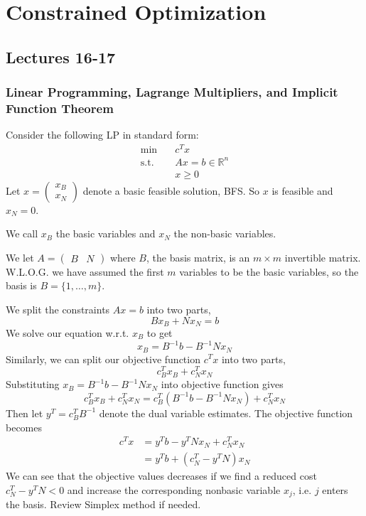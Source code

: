 \newpage
\section{Constrained Optimization}
\subsection{Lectures 16-17}
\subsubsection{Linear Programming, Lagrange Multipliers, and Implicit Function Theorem}
\begin{example}
    Consider the following LP in standard form:
    \begin{align*}
        \min \quad & c^T x \\
        \text{s.t.} \quad & Ax = b \in \mathbb R^n\\
        & x \geq 0
    \end{align*}
    Let $x = \begin{pmatrix}x_B \\ x_N \end{pmatrix}$ denote a basic feasible solution, BFS. So $x$ is feasible and $x_N = 0$. 
    
    We call $x_B$ the basic variables and $x_N$ the non-basic variables. 
    
    We let $A = \begin{pmatrix}B & N\end{pmatrix}$ where $B$, the basis matrix, is an $m \times m$ invertible matrix. W.L.O.G. we have assumed the first $m$ variables to be the basic variables, so the basis is $B = \{1,\ldots,m\}$.

    We split the constraints $Ax = b$ into two parts, $$Bx_B + Nx_N = b$$ 
    We solve our equation w.r.t. $x_B$ to get $$x_B = B^{-1}b - B^{-1}Nx_N$$
    Similarly, we can split our objective function $c^T x$ into two parts, $$c^T_B x_B + c^T_N x_N$$ Substituting $x_B = B^{-1}b - B^{-1}Nx_N$ into objective function gives
    $$c^T_B x_B + c^T_N x_N = c^T_B(B^{-1}b - B^{-1}Nx_N) + c^T_N x_N$$
    Then let $y^T = c^T_BB^{-1}$ denote the dual variable estimates. The objective function becomes
    \begin{align*}
        c^Tx &= y^Tb - y^TNx_N + c^T_Nx_N \\
        &= y^Tb + (c^T_N - y^TN)x_N
    \end{align*}
    We can see that the objective values decreases if we find a reduced cost $c^T_N - y^TN < 0$ and increase the corresponding nonbasic variable $x_j$, i.e. $j$ enters the basis. Review Simplex method if needed.
\end{example}